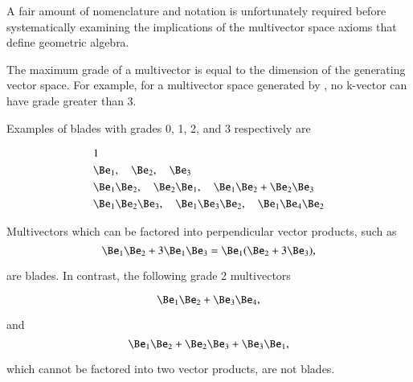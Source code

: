 %
%
A fair amount of nomenclature and notation is unfortunately required before systematically examining the implications of the multivector space axioms that define geometric algebra.


The maximum grade of a multivector is equal to the dimension of the generating vector space.
For example, for a multivector space generated by , no k-vector can have grade greater than 3.

Examples of blades with grades 0, 1, 2, and 3 respectively are

\begin{dmath}\label{eqn:multivector:180}
\begin{aligned}
&1 \\
&\Be_1,\quad \Be_2,\quad \Be_3 \\
&\Be_1 \Be_2,\quad \Be_2 \Be_1,\quad \Be_1 \Be_2 + \Be_2 \Be_3 \\
&\Be_1 \Be_2 \Be_3,\quad \Be_1 \Be_3 \Be_2,\quad \Be_1 \Be_4 \Be_2
\end{aligned}
\end{dmath}

Multivectors which can be factored into perpendicular vector products, such as
\begin{dmath}\label{eqn:multiplication:220}
\Be_1 \Be_2 + 3 \Be_1 \Be_3
=
\Be_1 (\Be_2 + 3 \Be_3),
\end{dmath}

are blades.  In contrast, the following grade 2 multivectors

\begin{dmath}\label{eqn:multiplication:240}
\Be_1 \Be_2 + \Be_3 \Be_4,
\end{dmath}

and
\begin{dmath}\label{eqn:multiplication:260}
\Be_1 \Be_2 + \Be_2 \Be_3 + \Be_3 \Be_1,
\end{dmath}

which cannot be factored into two vector products, are not blades.

